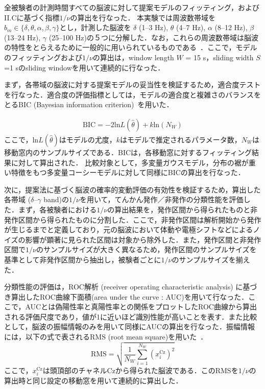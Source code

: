 \documentclass[journal]{IEEEtran}
\begin{document}
全被験者の計測時間すべての脳波に対して提案モデルのフィッティング，およびII.Cに基づく指標$1/\nu$の算出を行なった．
本実験では周波数帯域を$b_m \in\{\delta, \theta, \alpha,\beta, \gamma\}$とし，計測した脳波を
$\delta$ (1--3 Hz), $\theta$ (4--7 Hz), $\alpha$ (8--12 Hz), $\beta$ (13--24 Hz), $\gamma$ (25--100 Hz)の５つに分解した．なお，これらの周波数帯域は脳波の特性をとらえるために一般的に用いられているものである~\cite{ep1994}．ここで，モデルのフィッティングおよび$1/\nu$の算出は，window length $W$ = 15 s，sliding width $S$ =1 sのsliding windowを用いて連続的に行なった．

まず，各帯域の脳波に対する提案モデルの妥当性を検証するため，適合度テストを行なった．適合度の評価指標としては，モデルの適合度と複雑さのバランスをとるBIC (Bayesian information criterion)~\cite{Schwarz1978}を用いた．

\begin{align}%
	\mathrm{BIC} = -2 \mathrm{ln}L(\hat{\theta}) + k \mathrm{ln}(N_W)
\end{align}
ここで，$\mathrm{ln}L(\hat{\theta})$はモデルの尤度，$k$はモデルで推定されるパラメータ数，$N_W$は移動窓内のサンプルサイズである．BICは，各移動窓に対するフィッティング結果に対して算出された．
比較対象として，多変量ガウスモデル，分布の裾が重い特徴をもつ多変量コーシーモデルに対して同様にBICの算出を行なった．

次に，提案法に基づく脳波の確率的変動評価の有効性を検証するため，算出した各帯域 ($\delta$--$\gamma$ band)の$1/\nu$を用いて，てんかん発作／非発作の分類性能を評価した．まず，各被験者における$1/\nu$の算出結果を，発作区間から得られたものと非発作区間から得られたものに分割した．ここで，非発作区間は解析開始から発作が生じるまでと定義しており，元の脳波において体動や電極シフトなどによるノイズの影響が顕著に見られた区間は対象から除外した．また，発作区間と非発作区間で$1/\nu$のサンプルサイズが大きく異なるため，発作区間のサンプルサイズを基準として非発作区間から抽出し，被験者ごとに$1/\nu$のサンプルサイズを揃えた．

分類性能の評価は，ROC解析 (receiver operating characteristic analysis) に基づき算出したROC曲線下面積(area under the curve : AUC)を用いて行なった．ここで，AUCとは偽陽性率と真陽性率との関係をプロットしたROC曲線から算出される評価尺度であり，値が1に近いほど識別性能が高いことを表す．また比較として，脳波の振幅情報のみを用いて同様にAUCの算出を行なった．振幅情報には，以下の式で表されるRMS (root mean square)を用いた~\cite{Hamedi2014}．
\begin{equation}%
		\mathrm{RMS} = \sqrt{\frac{1}{N_W} \sum_{i=1}^{N_W} (x_i^\mathrm{Cz})^2}
\end{equation}
ここで，$x_i^\mathrm{Cz}$は頭頂部のチャネルCzから得られた脳波である．このRMSを$1/\nu$の算出時と同じ設定の移動窓を用いて連続的に算出した．
\end{document}
